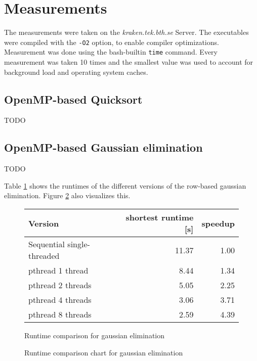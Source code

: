 \documentclass[]{article}
\begin{document}
\section{Measurements}

The measurements were taken on the \emph{kraken.tek.bth.se} Server. The executables were compiled with the \texttt{-O2} option, to enable compiler optimizations. Measurement was done using the bash-builtin \texttt{time} command. Every measurement was taken 10 times and the smallest value was used to account for background load and operating system caches.

\subsection{OpenMP-based Quicksort}

TODO

\subsection{OpenMP-based Gaussian elimination}

TODO

Table \ref{tab:gauss-runtime} shows the runtimes of the different versions of the row-based gaussian elimination. Figure \ref{fig:gauss-chart} also visualizes this.

\begin{figure}[h]
	\centering
	\begin{tabular}{|l|r|r|}
		\hline
		\textbf{Version} & \textbf{shortest runtime [s]} & \textbf{speedup} \\
		\hline
		Sequential single-threaded		& 11.37 & 1.00 \\ 
		\hline 
		pthread 1 thread				& 8.44 & 1.34 \\ 
		\hline 
		pthread 2 threads				& 5.05 & 2.25 \\ 
		\hline 
		pthread 4 threads 				& 3.06 & 3.71 \\ 
		\hline 
		pthread 8 threads				& 2.59 & 4.39 \\ 
		\hline 
	\end{tabular} 
	\caption{Runtime comparison for gaussian elimination}
	\label{tab:gauss-runtime}
\end{figure}

\begin{figure}[h]
	\centering
	\caption{Runtime comparison chart for gaussian elimination}
	\label{fig:gauss-chart}
\end{figure}
\end{document}
